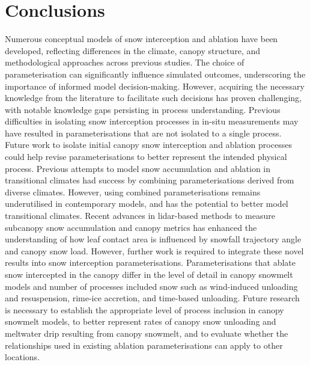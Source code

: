 \documentclass[
  letterpaper,
]{tex/uofsthesis-cs}
\begin{document}
\section{Conclusions}\label{conclusions}

Numerous conceptual models of snow interception and ablation have been
developed, reflecting differences in the climate, canopy structure, and
methodological approaches across previous studies. The choice of
parameterisation can significantly influence simulated outcomes,
underscoring the importance of informed model decision-making. However,
acquiring the necessary knowledge from the literature to facilitate such
decisions has proven challenging, with notable knowledge gaps persisting
in process understanding. Previous difficulties in isolating snow
interception processes in in-situ measurements may have resulted in
parameterisations that are not isolated to a single process. Future work
to isolate initial canopy snow interception and ablation processes could
help revise parameterisations to better represent the intended physical
process. Previous attempts to model snow accumulation and ablation in
transitional climates had success by combining parameterisations derived
from diverse climates. However, using combined parameterisations remains
underutilised in contemporary models, and has the potential to better
model transitional climates. Recent advances in lidar-based methods to
measure subcanopy snow accumulation and canopy metrics has enhanced the
understanding of how leaf contact area is influenced by snowfall
trajectory angle and canopy snow load. However, further work is required
to integrate these novel results into snow interception
parameterisations. Parameterisations that ablate snow intercepted in the
canopy differ in the level of detail in canopy snowmelt models and
number of processes included snow such as wind-induced unloading and
resuspension, rime-ice accretion, and time-based unloading. Future
research is necessary to establish the appropriate level of process
inclusion in canopy snowmelt models, to better represent rates of canopy
snow unloading and meltwater drip resulting from canopy snowmelt, and to
evaluate whether the relationships used in existing ablation
parameterisations can apply to other locations.
\end{document}
